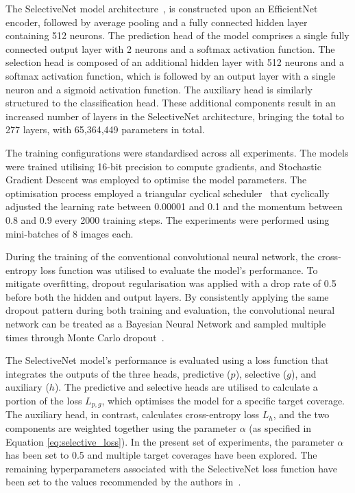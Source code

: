 The SelectiveNet model architecture~\citep{geifman2019selectivenet}, is constructed upon an EfficientNet encoder, followed by average pooling and a fully connected hidden layer containing 512 neurons. The prediction head of the model comprises a single fully connected output layer with 2 neurons and a softmax activation function. The selection head is composed of an additional hidden layer with 512 neurons and a softmax activation function, which is followed by an output layer with a single neuron and a sigmoid activation function. The auxiliary head is similarly structured to the classification head. These additional components result in an increased number of layers in the SelectiveNet architecture, bringing the total to 277 layers, with 65,364,449 parameters in total.

The training configurations were standardised across all experiments. The models were trained utilising 16-bit precision to compute gradients, and Stochastic Gradient Descent was employed to optimise the model parameters. The optimisation process employed a triangular cyclical scheduler~\citep{smith2017cyclical} that cyclically adjusted the learning rate between 0.00001 and 0.1 and the momentum between 0.8 and 0.9 every 2000 training steps. The experiments were performed using mini-batches of 8 images each.

During the training of the conventional convolutional neural network, the cross-entropy loss function was utilised to evaluate the model's performance. To mitigate overfitting, dropout regularisation was applied with a drop rate of 0.5 before both the hidden and output layers. By consistently applying the same dropout pattern during both training and evaluation, the convolutional neural network can be treated as a Bayesian Neural Network and sampled multiple times through Monte Carlo dropout~\citep{gal2016dropout}.

The SelectiveNet model's performance is evaluated using a loss function that integrates the outputs of the three heads, predictive ($p$), selective ($g$), and auxiliary ($h$). The predictive and selective heads are utilised to calculate a portion of the loss $L_{p,g}$, which optimises the model for a specific target coverage. The auxiliary head, in contrast, calculates cross-entropy loss $L_h$, and the two components are weighted together using the parameter $\alpha$ (as specified in Equation \ref{eq:selective_loss}). In the present set of experiments, the parameter $\alpha$ has been set to 0.5 and multiple target coverages have been explored. The remaining hyperparameters associated with the SelectiveNet loss function have been set to the values recommended by the authors in~\citep{geifman2019selectivenet}.

